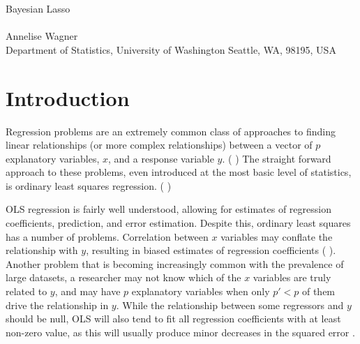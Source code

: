 \documentclass{uwstat572}
\newcommand{\vmadd}[1]{\textbf{\color{red}{#1}}}
\newcommand{\vmcomment}[1]{({\color{blue}{VM's comment:}} \textbf{\color{blue}{#1}})}
\begin{document}

\begin{center}
  {\LARGE Bayesian Lasso}\\\ \\
  {Annelise Wagner \\ 
    Department of Statistics, University of Washington Seattle, WA, 98195, USA
  }
\end{center}



\begin{abstract}
  The Bayesian Lasso, building on the interpretation of Tibshirani, places Laplace priors on linear regression coefficients to allow for Bayesian approaches to parameter and error estimation. An efficient Gibbs sampler allows for quick computation and may be exanded to other forms of penalized regression.
\end{abstract}

\section{Introduction}\label{Introduction}
Regression problems are an extremely common class of approaches to finding linear relationships (or more complex relationships) between a vector of $p$ explanatory variables, $x$, and a response variable $y$. \vmcomment{All vectors and matrices should be bolded.} 
The straight forward approach to these problems, even introduced at the most basic level of statistics, is ordinary least squares \vmadd{(OLS)} regression. 
\vmcomment{Maybe include some refs; also mention examples of scientific or engineering problems solved by regression.}

OLS regression is fairly well understood, allowing for estimates of regression coefficients, prediction, and error estimation. Despite this, ordinary least squares has a number of problems. Correlation between $x$ variables may conflate the relationship with $y$, resulting in biased estimates of regression coefficients \vmcomment{Reference?}.
Another problem that is becoming increasingly common with the prevalence of large datasets, a researcher may not know which of the $x$ variables are truly related to $y$, and may have $p$ explanatory variables when only $p'<p$ of them drive the relationship in $y$. While the relationship between some regressors and $y$ should be null, OLS will also tend to fit all regression coefficients with at least non-zero value, as this will usually produce minor decreases in the squared error \citep{seeger2008bayesian}.
\end{document}
